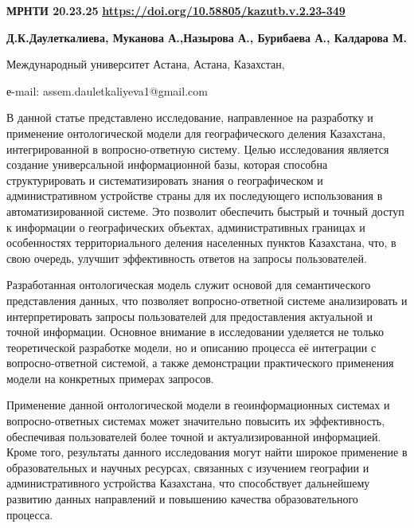 \newpage
{\bfseries МРНТИ 20.23.25}
\hfill {\bfseries \href{https://doi.org/10.58805/kazutb.v.2.23-349}{https://doi.org/10.58805/kazutb.v.2.23-349}}


\begin{center}
{\bfseries Д.К.Даулеткалиева, Муканова А.,Назырова А., Бурибаева А., Калдарова М.}

Международный университет Астана, Астана, Казахстан,

е-mail: assem.dauletkaliyeva1@gmail.com
\end{center}

В данной статье представлено исследование, направленное на разработку и
применение онтологической модели для географического деления Казахстана,
интегрированной в вопросно-ответную систему. Целью исследования является
создание универсальной информационной базы, которая способна
структурировать и систематизировать знания о географическом и
административном устройстве страны для их последующего использования в
автоматизированной системе. Это позволит обеспечить быстрый и точный
доступ к информации о географических объектах, административных границах
и особенностях территориального деления населенных пунктов Казахстана,
что, в свою очередь, улучшит эффективность ответов на запросы
пользователей.

Разработанная онтологическая модель служит основой для семантического
представления данных, что позволяет вопросно-ответной системе
анализировать и интерпретировать запросы пользователей для
предоставления актуальной и точной информации. Основное внимание в
исследовании уделяется не только теоретической разработке модели, но и
описанию процесса её интеграции с вопросно-ответной системой, а также
демонстрации практического применения модели на конкретных примерах
запросов.

Применение данной онтологической модели в геоинформационных системах и
вопросно-ответных системах может значительно повысить их эффективность,
обеспечивая пользователей более точной и актуализированной информацией.
Кроме того, результаты данного исследования могут найти широкое
применение в образовательных и научных ресурсах, связанных с изучением
географии и административного устройства Казахстана, что способствует
дальнейшему развитию данных направлений и повышению качества
образовательного процесса.

